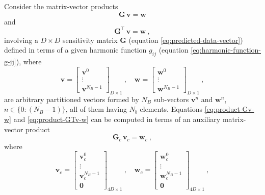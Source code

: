 \documentclass[utf8]{FrontiersinHarvard} %
\begin{document}
	Consider the matrix-vector products
	\begin{equation}
		\mathbf{G} \, \mathbf{v} = \mathbf{w}
		\label{eq:product-Gv-w}
	\end{equation}
	and
	\begin{equation}
		\mathbf{G}^{\top} \, \mathbf{v} = \mathbf{w} \: ,
		\label{eq:product-GTv-w}
	\end{equation}
	involving a $D \times D$ sensitivity matrix $\mathbf{G}$ (equation \ref{eq:predicted-data-vector}) defined in terms of a given
	harmonic function $g_{ij}$ (equation \ref{eq:harmonic-function-g-ij}), where 
	\begin{equation}
		\mathbf{v} = \begin{bmatrix}
			\mathbf{v}^{0} \\ \vdots \\ \mathbf{v}^{N_{B}-1}
		\end{bmatrix}_{D \times 1} \: , \quad 
		\mathbf{w} = \begin{bmatrix}
			\mathbf{w}^{0} \\ \vdots \\ \mathbf{w}^{N_{B}-1}
		\end{bmatrix}_{D \times 1} \: ,
		\label{eq:vectors-v-w}
	\end{equation}
	are arbitrary partitioned vectors formed by $N_{B}$ sub-vectors $\mathbf{v}^{n}$ and $\mathbf{w}^{n}$,
	$n \in \{ 0 : (N_{B} - 1) \}$, all of them having $N_{b}$ elements.
	Equations \ref{eq:product-Gv-w} and \ref{eq:product-GTv-w} can be computed in terms of an auxiliary matrix-vector product
	\begin{equation}
		\mathbf{G}_{c} \, \mathbf{v}_{c} = \mathbf{w}_{c} \: ,
		\label{eq:aux-BCCB-system}
	\end{equation}
	where 
	\begin{equation}
		\mathbf{v}_{c} = \begin{bmatrix}
			\mathbf{v}_{c}^{0} \\ \vdots \\ \mathbf{v}_{c}^{N_{B}-1} \\ \mathbf{0}
		\end{bmatrix}_{4D \times 1} \: , \quad 
		\mathbf{w}_{c} = \begin{bmatrix}
			\mathbf{w}_{c}^{0} \\ \vdots \\ \mathbf{w}_{c}^{N_{B}-1} \\ \mathbf{0}
		\end{bmatrix}_{4D \times 1} \: ,
		\label{eq:vectors-vc-wc}
	\end{equation}
\end{document}
